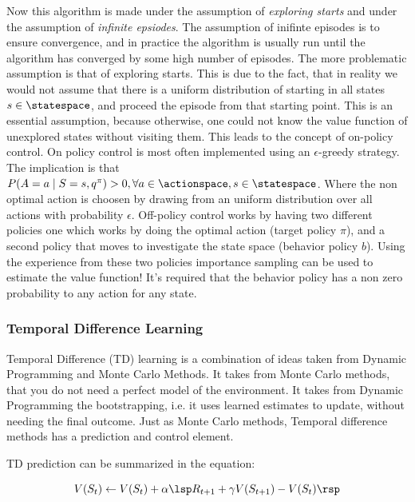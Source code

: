 Now this algorithm is made under the assumption of \textit{exploring starts} and under the assumption of \textit{infinite epsiodes}. The assumption of inifinte episodes is to ensure convergence, and in practice the algorithm is usually run until the algorithm has converged by some high number of episodes. The more problematic assumption is that of exploring starts. This is due to the fact, that in reality we would not assume that there is a uniform distribution of starting in all states $s \in \statespace$, and proceed the episode from that starting point. This is an essential assumption, because otherwise, one could not know the value function of unexplored states without visiting them. This leads to the concept of on-policy control. On policy control is most often implemented using an $\epsilon$-greedy strategy. The implication is that $P(A=a \mid S=s, q^{\pi}) > 0, \forall a \in \actionspace, s \in \statespace$. Where the non optimal action is choosen by drawing from an uniform distribution over all actions with probability $\epsilon$. Off-policy control works by having two different policies one which works by doing the optimal action (target policy $\pi$), and a second policy that moves to investigate the state space (behavior policy $b$). Using the experience from these two policies importance sampling can be used to estimate the value function! It's required that the behavior policy has a non zero probability to any action for any state.

\subsubsection{Temporal Difference Learning}

Temporal Difference (TD) learning is a combination of ideas taken from Dynamic Programming and Monte Carlo Methods. It takes from Monte Carlo methods, that you do not need a perfect model of the environment. It takes from Dynamic Programming the bootstrapping, i.e. it uses learned estimates to update, without needing the final outcome. Just as Monte Carlo methods, Temporal difference methods has a prediction and control element. 

TD prediction can be summarized in the equation:

\begin{equation}
    V(S_t) \leftarrow V(S_t) + \alpha \lsp R_{t+1} + \gamma V(S_{t+1}) - V(S_t) \rsp
\end{equation}

